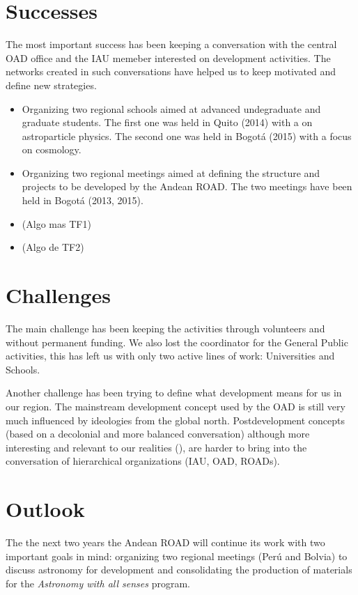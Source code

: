 \documentclass{iau}
\begin{document}
\section{Successes}

The most important success has been keeping a conversation with the
central OAD office and the IAU memeber interested on development
activities. 
The networks created in such conversations have helped us to keep
motivated and define new strategies.
\begin{itemize}
\item Organizing two regional schools aimed at advanced undegraduate
  and graduate students. The first one was held in Quito (2014) with a
  on astroparticle physics. The second one was held in Bogot\'a (2015)
  with a focus on cosmology.
\item Organizing two regional meetings aimed at defining the structure
  and projects to be developed by the Andean ROAD. The two meetings
  have been held in Bogot\'a (2013, 2015). 
\item (Algo mas TF1)
\item (Algo de TF2)
\end{itemize}



\section{Challenges}


The main challenge has been keeping the activities through volunteers
and without permanent funding. 
We also lost the coordinator for the General Public activities, this
has left us with only two active lines of work: Universities and
Schools. 

Another challenge has been trying to define what development means for
us in our region. 
The mainstream development concept used by the OAD is still very much
influenced by ideologies from the global north.
Postdevelopment concepts (based on a decolonial and more balanced
conversation) although more interesting and relevant to our realities
(\cite{Grosfoguel02}), are harder to bring into the conversation of
hierarchical organizations (IAU, OAD, ROADs).  

\section{Outlook}
The the next two years the Andean ROAD will continue its work with two
important goals in mind: organizing two regional meetings (Per\'u
and Bolvia) to discuss astronomy for development and consolidating the
production of materials for the \emph{Astronomy with all senses}
program. 
\end{document}
